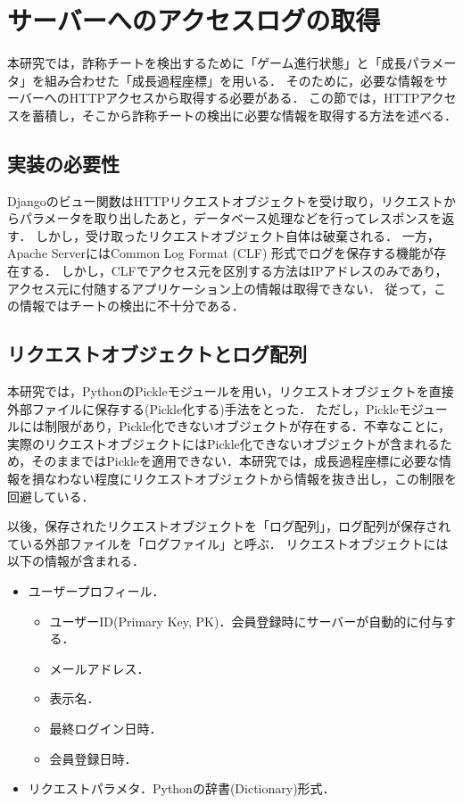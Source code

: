 \section{サーバーへのアクセスログの取得}
本研究では，詐称チートを検出するために「ゲーム進行状態」と「成長パラメータ」を組み合わせた「成長過程座標」を用いる．
そのために，必要な情報をサーバーへのHTTPアクセスから取得する必要がある．
この節では，HTTPアクセスを蓄積し，そこから詐称チートの検出に必要な情報を取得する方法を述べる．

\subsection{実装の必要性}
Djangoのビュー関数はHTTPリクエストオブジェクトを受け取り，リクエストからパラメータを取り出したあと，データベース処理などを行ってレスポンスを返す．
しかし，受け取ったリクエストオブジェクト自体は破棄される．
一方，Apache ServerにはCommon Log Format\cite{clf} (CLF) 形式でログを保存する機能が存在する．
しかし，CLFでアクセス元を区別する方法はIPアドレスのみであり，アクセス元に付随するアプリケーション上の情報は取得できない．
従って，この情報ではチートの検出に不十分である．

\subsection{リクエストオブジェクトとログ配列}
本研究では，PythonのPickleモジュール\cite{pickle}を用い，リクエストオブジェクトを直接外部ファイルに保存する(Pickle化する)手法をとった．
ただし，Pickleモジュールには制限があり，Pickle化できないオブジェクトが存在する．不幸なことに，実際のリクエストオブジェクトにはPickle化できないオブジェクトが含まれるため，そのままではPickleを適用できない．本研究では，成長過程座標に必要な情報を損なわない程度にリクエストオブジェクトから情報を抜き出し，この制限を回避している．

以後，保存されたリクエストオブジェクトを「ログ配列」，ログ配列が保存されている外部ファイルを「ログファイル」と呼ぶ．
リクエストオブジェクトには以下の情報が含まれる．

\begin{itemize}
\item
ユーザープロフィール．
\begin{itemize}
\item
ユーザーID(Primary Key, PK)．会員登録時にサーバーが自動的に付与する．
\item
メールアドレス．
\item
表示名．
\item
最終ログイン日時．
\item
会員登録日時．
\end{itemize}
\item
リクエストパラメタ．Pythonの辞書(Dictionary)形式．
\end{itemize}

